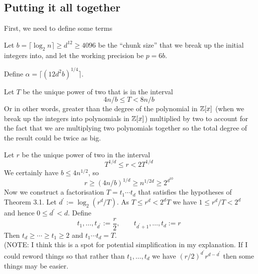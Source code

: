 \subsection{Putting it all together}%
\label{sub:Putting it all together}

First, we need to define some terms

Let $b = \lceil \log_2 n\rceil \geq d^{12} \geq 4096$ be the ``chunk size'' that we break up the initial integers into, and let the working precision be $p = 6b$.

Define $\alpha = \lceil (12d^2 b)^{1/4}\rceil$.





Let $T$ be the unique power of two that is in the interval
\begin{equation}
    4n/b \leq T < 8n/b
\end{equation}
Or in other words, greater than the degree of the polynomial in ${\mathbb Z}[x]$ (when we break up the integers into polynomials in ${\mathbb Z}[x]$) multiplied by two to account for the fact that we are multiplying two polynomials together so the total degree of the result could be twice as big.

Let $r$ be the unique power of two in the interval
\[
    T^{1/d} \leq r < 2T^{1/d}
\]
We certainly have $b \leq 4n^{1/2}$, so
\[
    r \geq (4n/b)^{1/d} \geq n^{1/2d} \geq 2^{d^{10}}
\]
Now we construct a factorisation $T = t_1 \cdots t_d$ that satisfies the hypotheses of Theorem 3.1. Let $d^\prime := \log_2(r^d / T)$. As $T \leq r^d < 2^d T$ we have $1 \leq r^d / T < 2^d$ and hence $0 \leq d^\prime < d$. Define
\[
    t_1, \ldots, t_{d^\prime} := \frac{r}{2}, \qquad t_{d^\prime + 1} , \ldots, t_d := r
\]
Then $t_d \geq \cdots \geq t_1 \geq 2$ and $t_1\cdots t_d = T$.\\
(NOTE: I think this is a spot for potential simplification in my explanation. If I could reword things so that rather than $t_1, \ldots, t_d$ we have $(r/2)^{d^\prime} r^{d-d^\prime}$ then some things may be easier.

